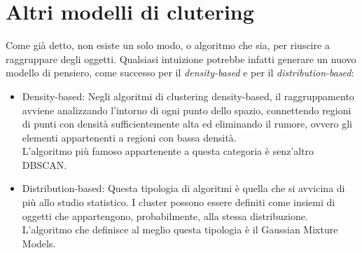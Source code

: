 \section{Altri modelli di clutering}
	Come già detto, non esiste un solo modo, o algoritmo che sia, per riuscire a raggruppare degli oggetti. Qualsiasi intuizione potrebbe infatti generare un nuovo modello di pensiero, come successo per il \emph{density-based} e per il \emph{distribution-based}:

	\begin{itemize}
		\item Density-based:
			Negli algoritmi di clustering density-based, il raggruppamento avviene analizzando l'intorno di ogni punto dello spazio, connettendo regioni di punti con densità sufficientemente alta ed eliminando il rumore, ovvero gli elementi appartenenti a regioni con bassa densità\cite{Density_based_clustering}.\\
			L'algoritmo più famoso appartenente a questa categoria è senz'altro DBSCAN.
		
		\item Distribution-based:
			Questa tipologia di algoritmi è quella che si avvicina di più allo studio statistico. I cluster possono essere definiti come insiemi di oggetti che appartengono, probabilmente, alla stessa distribuzione\cite{distribution-based_clustering}. \\
			L'algoritmo che definisce al meglio questa tipologia è il Gaussian Mixture Models.
	\end{itemize}